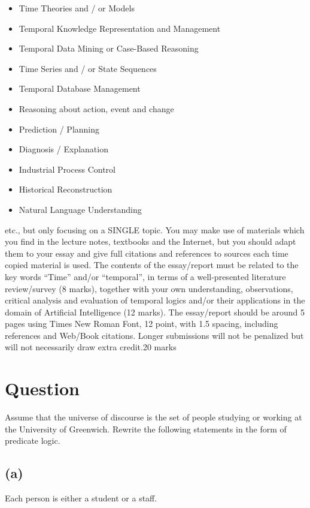 \documentclass[12pt,a4paper]{article}
\begin{document}
		\begin{itemize}
		
	
    \item Time Theories and / or Models
	\item Temporal Knowledge Representation and Management
	 \item  Temporal Data Mining or Case-Based Reasoning
	 \item  Time Series and / or State Sequences
	  \item Temporal Database Management
	\item  Reasoning about action, event and change
	 \item Prediction / Planning
	\item  Diagnosis / Explanation
	\item Industrial Process Control
    \item Historical Reconstruction
	\item Natural Language Understanding
\end{itemize}
	etc., but only focusing on a SINGLE topic. You may make use of materials which you find in the lecture notes, textbooks and the Internet, but you should adapt them to your essay and give full citations and references to sources each time copied material is used. The contents of the essay/report must be related to the key words “Time” and/or “temporal”, in terms of a well-presented literature review/survey (8 marks), together with your own understanding, observations, critical analysis and evaluation of temporal logics and/or their applications in the domain of Artificial Intelligence (12 marks). The essay/report should be around 5 pages using Times New Roman Font, 12 point, with 1.5 spacing, including references and Web/Book citations. Longer submissions will not be penalized but will not necessarily draw extra credit.{20 marks}
	
	
	
	\section{Question} 
	Assume that the universe of discourse is the set of people studying or working at the University of Greenwich. Rewrite the following statements in the form of predicate logic.
		\subsection{(a)}
		Each person is either a student or a staff.
		
\end{document}
